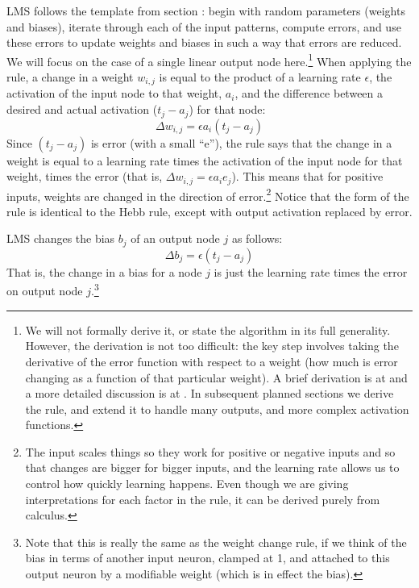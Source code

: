 LMS follows the template from section : begin with random parameters (weights and biases), iterate through each of the input patterns, compute errors, and use these errors to update weights and biases in such a way that errors are reduced. We will focus on the case of a single linear output node here.\footnote{We will not formally derive it, or state the algorithm in its full generality. However, the derivation is not too difficult: the key step involves taking the derivative of the error function with respect to a weight (how much is error changing as a function of that particular weight). A brief derivation is at  and a more detailed discussion is at . In subsequent planned sections we derive the rule, and extend it to handle many outputs, and more complex activation functions.} When applying the rule, a change in a weight $w_{i,j}$ is equal to the product of a learning rate $\epsilon$, the activation of the input node to that weight, $a_i$, and the difference between a desired and actual activation ($t_j - a_j$) for that node:
\[
\Delta w_{i,j}  =  \epsilon a_i (t_j - a_j)
\]
Since $(t_j - a_j)$ is error  (with a small ``e''), the rule says that the change in a weight is equal to a learning rate times the activation of the input node for that weight, times the error (that is, $\Delta w_{i,j}  =  \epsilon a_i e_j$).  This means that for positive inputs, weights are changed in the direction of error.\footnote{The input scales things so they work for positive or negative inputs and so that changes are bigger for bigger inputs, and the learning rate allows us to control how quickly learning happens. Even though we are giving interpretations for each factor in the rule, it can be derived purely from calculus.} Notice that the form of the rule is identical to the Hebb rule, except with output activation replaced by error.

LMS changes the bias $b_j$ of an output node $j$ as follows:
\[
\Delta b_j  =  \epsilon (t_j - a_j)
\]
That is, the change in a bias for a node $j$ is just the learning rate times the error on output node $j$.\footnote{Note that this is really the same as the weight change rule, if we think of the bias in terms of another input neuron, clamped at 1, and attached to this output neuron by a modifiable weight (which is in effect the bias).}


